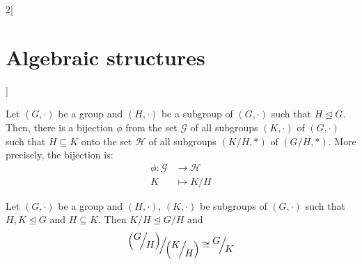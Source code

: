 \documentclass[../../../main.tex]{subfiles}
\begin{document}
\begin{multicols}{2}[\section{Algebraic structures}]
\begin{lemma}
    \end{lemma}
    \begin{theorem}
        Let $(G,\cdot)$ be a group and $(H,\cdot)$ be a subgroup of $(G,\cdot)$ such that $H\unlhd G$. Then, there is a bijection $\phi$ from the set $\mathcal{G}$ of all subgroups $(K,\cdot)$ of $(G,\cdot)$ such that $H\subseteq K$ onto the set $\mathcal{H}$ of all subgroups $\left(K/H,*\right)$ of $\left(G/H,*\right)$. More precisely, the bijection is:
        \begin{align*}
            \phi:\mathcal{G} & \longrightarrow\mathcal{H} \\
            K                & \longmapsto K/H
        \end{align*}
    \end{theorem}
    \begin{theorem}
        Let $(G,\cdot)$ be a group and $(H,\cdot)$, $(K,\cdot)$ be subgroups of $(G,\cdot)$ such that $H,K\unlhd G$ and $H\subseteq K$. Then $K/H\unlhd G/H$ and $$\quot{\left(\quot{G}{H}\right)}{\left(\quot{K}{H}\right)}\cong\quot{G}{K}$$
    \end{theorem}

\end{multicols}
\end{document}
